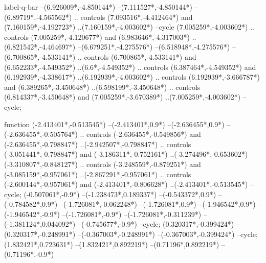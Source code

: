 {\begin{scope}[x=1mm,y=1mm,line width=\SCstroke mm,line cap=round,line join=round]
\begin{SCpart}{label-q-bar}
--({6.926009*\SCF},{-4.850144*\SCF})
--({7.111527*\SCF},{-4.850144*\SCF})
--({6.89719*\SCF},{-4.565562*\SCF})
.. controls ({7.093516*\SCF},{-4.412464*\SCF}) and ({7.160159*\SCF},{-4.192723*\SCF}) ..({7.160159*\SCF},{-4.003602*\SCF})
--cycle
({7.005259*\SCF},{-4.003602*\SCF})
.. controls ({7.005259*\SCF},{-4.120677*\SCF}) and ({6.983646*\SCF},{-4.317003*\SCF}) ..({6.821542*\SCF},{-4.464697*\SCF})
--({6.679251*\SCF},{-4.275576*\SCF})
--({6.518948*\SCF},{-4.275576*\SCF})
--({6.700865*\SCF},{-4.533141*\SCF})
.. controls ({6.700865*\SCF},{-4.533141*\SCF}) and ({6.652233*\SCF},{-4.549352*\SCF}) ..({6.6*\SCF},{-4.549352*\SCF})
.. controls ({6.387464*\SCF},{-4.549352*\SCF}) and ({6.192939*\SCF},{-4.338617*\SCF}) ..({6.192939*\SCF},{-4.003602*\SCF})
.. controls ({6.192939*\SCF},{-3.666787*\SCF}) and ({6.389265*\SCF},{-3.450648*\SCF}) ..({6.598199*\SCF},{-3.450648*\SCF})
.. controls ({6.814337*\SCF},{-3.450648*\SCF}) and ({7.005259*\SCF},{-3.670389*\SCF}) ..({7.005259*\SCF},{-4.003602*\SCF})
--cycle;
\end{SCpart}
\begin{SCpart}{function}
 ({-2.413401*\SCF},{-0.513545*\SCF})
--({-2.413401*\SCF},{0.9*\SCF})
--({-2.636455*\SCF},{0.9*\SCF})
--({-2.636455*\SCF},{-0.505764*\SCF})
.. controls ({-2.636455*\SCF},{-0.549856*\SCF}) and ({-2.636455*\SCF},{-0.798847*\SCF}) ..({-2.942507*\SCF},{-0.798847*\SCF})
.. controls ({-3.051441*\SCF},{-0.798847*\SCF}) and ({-3.186311*\SCF},{-0.752161*\SCF}) ..({-3.274496*\SCF},{-0.653602*\SCF})
--({-3.310807*\SCF},{-0.848127*\SCF})
.. controls ({-3.248559*\SCF},{-0.879251*\SCF}) and ({-3.085159*\SCF},{-0.957061*\SCF}) ..({-2.867291*\SCF},{-0.957061*\SCF})
.. controls ({-2.600144*\SCF},{-0.957061*\SCF}) and ({-2.413401*\SCF},{-0.806628*\SCF}) ..({-2.413401*\SCF},{-0.513545*\SCF})
--cycle;
 ({-0.507061*\SCF},{-0.9*\SCF})
--({-1.238473*\SCF},{0.189337*\SCF})
--({-0.543372*\SCF},{0.9*\SCF})
--({-0.784582*\SCF},{0.9*\SCF})
--({-1.726081*\SCF},{-0.062248*\SCF})
--({-1.726081*\SCF},{0.9*\SCF})
--({-1.946542*\SCF},{0.9*\SCF})
--({-1.946542*\SCF},{-0.9*\SCF})
--({-1.726081*\SCF},{-0.9*\SCF})
--({-1.726081*\SCF},{-0.311239*\SCF})
--({-1.381124*\SCF},{0.044092*\SCF})
--({-0.745677*\SCF},{-0.9*\SCF})
--cycle;
 ({0.320317*\SCF},{-0.399424*\SCF})
--({0.320317*\SCF},{-0.248991*\SCF})
--({-0.367003*\SCF},{-0.248991*\SCF})
--({-0.367003*\SCF},{-0.399424*\SCF})
--cycle;
 ({1.832421*\SCF},{0.723631*\SCF})
--({1.832421*\SCF},{0.892219*\SCF})
--({0.71196*\SCF},{0.892219*\SCF})
--({0.71196*\SCF},{-0.9*\SCF})

\end{SCpart}
\end{scope}}
